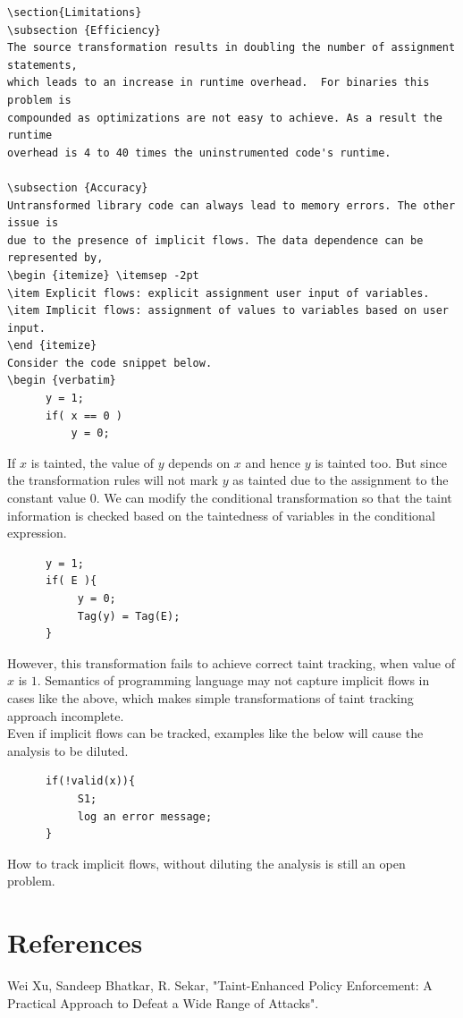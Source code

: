 \documentclass[11pt]{article} %
\begin{document}
\begin {verbatim}
\section{Limitations}
\subsection {Efficiency}
The source transformation results in doubling the number of assignment statements,
which leads to an increase in runtime overhead.  For binaries this problem is
compounded as optimizations are not easy to achieve. As a result the runtime
overhead is 4 to 40 times the uninstrumented code's runtime.

\subsection {Accuracy}
Untransformed library code can always lead to memory errors. The other issue is
due to the presence of implicit flows. The data dependence can be represented by,
\begin {itemize} \itemsep -2pt
\item Explicit flows: explicit assignment user input of variables.
\item Implicit flows: assignment of values to variables based on user input.
\end {itemize}
Consider the code snippet below.
\begin {verbatim}
      y = 1;
      if( x == 0 )
          y = 0;
\end {verbatim}
If $x$ is tainted, the value of $y$ depends on $x$ and hence $y$ is tainted too.
But since the transformation rules will not mark $y$ as tainted due to the
assignment to the constant value $0$. We can modify the conditional transformation
so that the taint information is checked based on the taintedness of variables
in the conditional expression.
\begin {verbatim}
      y = 1;
      if( E ){
           y = 0;
           Tag(y) = Tag(E);
      }
\end {verbatim}

However, this transformation fails to achieve correct taint tracking, when value
of $x$ is $1$. Semantics of programming language may not capture implicit flows
in cases like the above, which makes simple transformations of taint tracking
approach incomplete.\\

Even if implicit flows can be tracked, examples like the below will cause the
analysis to be diluted.
\begin {verbatim}
      if(!valid(x)){
           S1;
           log an error message;
      }
\end {verbatim}

How to track implicit flows, without diluting the analysis is still an open
problem.

\section {References}
Wei Xu, Sandeep Bhatkar, R. Sekar, "Taint-Enhanced Policy Enforcement:
A Practical Approach to Defeat a Wide Range of Attacks".
\end{document}
